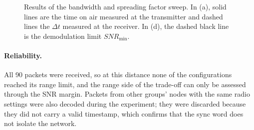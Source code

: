\documentclass[informe,english]{plantilla}
\begin{document}
\begin{figure}[htbp]
    \medskip
    \hfill
    \caption{Results of the bandwidth and spreading factor sweep. In (a), solid lines are the time on air measured at the transmitter and dashed lines the $\Delta t$ measured at the receiver. In (d), the dashed black line is the demodulation limit $SNR_{\min}$.}
    \label{fig:bw-results}
\end{figure}

\paragraph{Reliability.} All 90 packets were received, so at this distance none of the configurations reached its range limit, and the range side of the trade-off can only be assessed through the SNR margin. Packets from other groups' nodes with the same radio settings were also decoded during the experiment; they were discarded because they did not carry a valid timestamp, which confirms that the sync word does not isolate the network.
\end{document}
